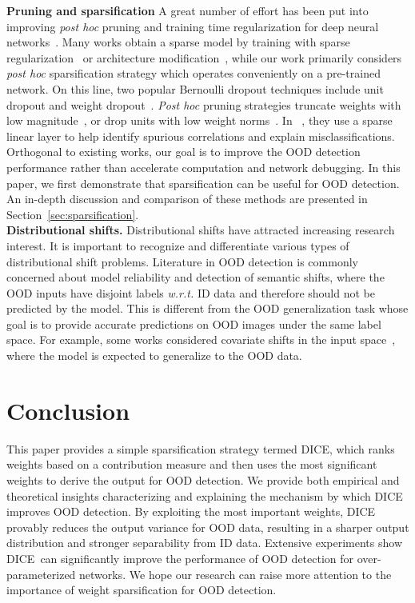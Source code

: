 \documentclass[runningheads]{llncs}
\newcommand{\methodAbbr}{DICE~}
\begin{document}
\noindent \textbf{Pruning and sparsification} 
A great number of effort has been put into improving \emph{post hoc} pruning and training time regularization for deep neural networks~\cite{adadrop2013neurips,Mohammad2016NoiseOut,targetDropout,Han2016deepcomp,Han2015prune,Hao2017pruneUnit,Christos2018l0prune}. Many works obtain a sparse model by training with sparse regularization~\cite{adadrop2013neurips,Mohammad2016NoiseOut,Han2016deepcomp,Christos2018l0prune,sun2019dka} or architecture modification~\cite{targetDropout,Hao2017pruneUnit}, while our work primarily considers \emph{post hoc} sparsification strategy which
operates conveniently on a {pre-trained} network. On this line, two popular Bernoulli dropout techniques include unit dropout and weight dropout~\cite{Nitish2014dropout}. 
\emph{Post hoc} pruning strategies truncate weights with low magnitude~\cite{Han2015prune}, or drop units with low weight norms~\cite{Hao2017pruneUnit}.  In ~\cite{wong2021leveraging}, they use a sparse linear layer to help identify spurious correlations and explain misclassifications. 
Orthogonal to existing works, our goal is to improve the OOD detection performance rather than accelerate computation and network debugging. In this paper, we first demonstrate that sparsification can be useful for OOD detection.
An in-depth discussion and comparison of these methods are presented in Section~\ref{sec:sparsification}. \\

\noindent \textbf{Distributional shifts.} Distributional shifts have attracted increasing research interest. It is important to recognize and differentiate various types of distributional shift problems. Literature in OOD detection is commonly concerned about model reliability and detection of semantic shifts, where the OOD inputs have disjoint labels \emph{w.r.t.} ID data and therefore {should not be predicted by the model}. This is different from the OOD generalization task whose goal is to provide accurate predictions on OOD images under the same label space. For example, some works considered covariate shifts in the input space~\cite{koh2021wilds,hendrycks2019benchmarking,ovadia2019can,sun2020test,zhou2021domain}, where the model is expected to generalize to the OOD data.



\section{Conclusion}
This paper provides a simple sparsification strategy termed DICE, which ranks weights based on a contribution measure and then uses the most significant weights to derive the output for OOD detection. We provide both empirical and theoretical insights characterizing and explaining the mechanism by which DICE improves OOD detection. By exploiting the most important weights, DICE provably reduces the output variance for OOD data, resulting in a sharper output distribution and stronger separability from ID data. Extensive experiments show \methodAbbr can significantly improve the performance of OOD detection for over-parameterized networks. We hope our research can raise more attention to the importance of weight sparsification for OOD detection.  
\end{document}
